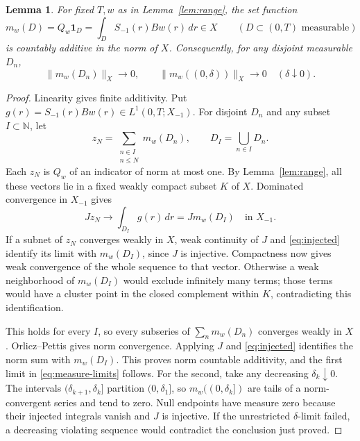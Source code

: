\documentclass[11pt]{article}
\newtheorem{lemma}[theorem]{Lemma}
\theoremstyle{remark}
\newcommand{\N}{\mathbb N}
\begin{document}
\begin{lemma}\label{lem:measure}
For fixed \(T,w\) as in Lemma~\ref{lem:range}, the set function
\[
 m_w(D)=Q_w\mathbf1_D
       =\int_D S_{-1}(r)Bw(r)\,dr\in X
 \qquad(D\subset(0,T)\text{ measurable})
\]
is countably additive in the norm of \(X\).
Consequently, for any disjoint measurable \(D_n\),
\begin{equation}\label{eq:measure-limits}
 \|m_w(D_n)\|_X\longrightarrow0,\qquad
 \|m_w((0,\delta))\|_X\longrightarrow0\quad(\delta\downarrow0).
\end{equation}
\end{lemma}

\begin{proof}
Linearity gives finite additivity. Put
\(g(r)=S_{-1}(r)Bw(r)\in L^1(0,T;X_{-1})\).
For disjoint \(D_n\) and any subset \(I\subset\N\), let
\[
 z_N=\sum_{\substack{n\in I\\n\le N}}m_w(D_n),\qquad
 D_I=\bigcup_{n\in I}D_n .
\]
Each \(z_N\) is \(Q_w\) of an indicator of norm at most one.
By Lemma~\ref{lem:range}, all these vectors lie in a fixed weakly
compact subset \(K\) of \(X\). Dominated convergence in \(X_{-1}\) gives
\begin{equation}\label{eq:injected}
 Jz_N\longrightarrow\int_{D_I}g(r)\,dr
             =Jm_w(D_I)\quad\text{in }X_{-1}.
\end{equation}
If a subnet of \(z_N\) converges weakly in \(X\), weak continuity of \(J\)
and \eqref{eq:injected} identify its limit with \(m_w(D_I)\), since
\(J\) is injective. Compactness now gives weak convergence of the whole
sequence to that vector. Otherwise a weak neighborhood of \(m_w(D_I)\)
would exclude infinitely many terms; those terms would have a cluster
point in the closed complement within \(K\), contradicting this
identification.

This holds for every \(I\), so every subseries of
\(\sum_n m_w(D_n)\) converges weakly in \(X\).
Orlicz--Pettis gives norm convergence. Applying \(J\) and
\eqref{eq:injected} identifies the norm sum with \(m_w(D_I)\).
This proves norm countable additivity, and the first limit in
\eqref{eq:measure-limits} follows.
For the second, take any decreasing \(\delta_k\downarrow0\).
The intervals \((\delta_{k+1},\delta_k]\) partition
\((0,\delta_1]\), so \(m_w((0,\delta_k])\) are tails of a norm-convergent
series and tend to zero. Null endpoints have measure zero because their
injected integrals vanish and \(J\) is injective.
If the unrestricted \(\delta\)-limit failed, a decreasing violating
sequence would contradict the conclusion just proved.
\end{proof}
\end{document}
